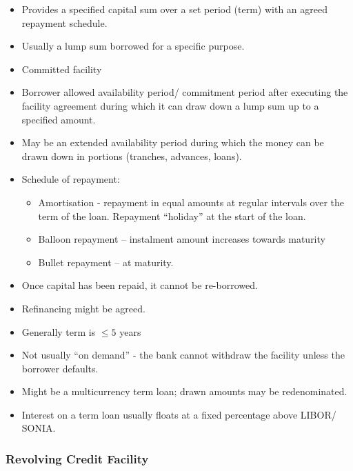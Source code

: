 \documentclass[
]{article}
\providecommand{\tightlist}{%
  \setlength{\itemsep}{0pt}\setlength{\parskip}{0pt}}
\begin{document}
\begin{itemize}
\tightlist
\item
  Provides a specified capital sum over a set period (term) with an
  agreed repayment schedule.
\item
  Usually a lump sum borrowed for a specific purpose.
\item
  Committed facility
\item
  Borrower allowed availability period/ commitment period after
  executing the facility agreement during which it can draw down a lump
  sum up to a specified amount.
\item
  May be an extended availability period during which the money can be
  drawn down in portions (tranches, advances, loans).
\item
  Schedule of repayment:

  \begin{itemize}
  \tightlist
  \item
    Amortisation - repayment in equal amounts at regular intervals over
    the term of the loan. Repayment ``holiday'' at the start of the
    loan.
  \item
    Balloon repayment -- instalment amount increases towards maturity
  \item
    Bullet repayment -- at maturity.
  \end{itemize}
\item
  Once capital has been repaid, it cannot be re-borrowed.
\item
  Refinancing might be agreed.
\item
  Generally term is {\(\leq 5\)} years
\item
  Not usually ``on demand'' - the bank cannot withdraw the facility
  unless the borrower defaults.
\item
  Might be a multicurrency term loan; drawn amounts may be
  redenominated.
\item
  Interest on a term loan usually floats at a fixed percentage above
  LIBOR/ SONIA.
\end{itemize}

\hypertarget{revolving-credit-facility}{%
\subsubsection{Revolving Credit
Facility}\label{revolving-credit-facility}}
\end{document}
